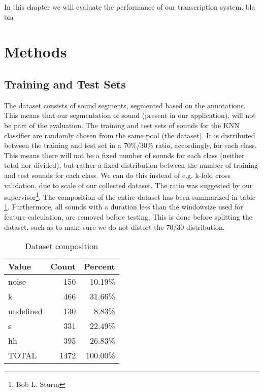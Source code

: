 In this chapter we will evaluate the performance of our transcription system. bla bla

\section{Methods}

	\subsection{Training and Test Sets}
		The dataset consists of sound segments, segmented based on the annotations. This means that our segmentation of sound (present in our application), will not be part of the evaluation.
		The training and test sets of sounds for the KNN classifier are randomly chosen from the same pool (the dataset). It is distributed between the training and test set in a 70\%/30\% ratio, accordingly, for each class. This means there will not be a fixed number of sounds for each class (neither total nor divided), but rather a fixed distribution between the number of training and test sounds for each class. We can do this instead of e.g. k-fold cross validation, due to scale of our collected dataset. The ratio was suggested by our supervisor\footnote{Bob L. Sturm}. The composition of the entire dataset has been summarized in table \ref{table:eval:datasetComposition}. 
		Furthermore, all sounds with a duration less than the windowsize used for feature calculation, are removed before testing. This is done before splitting the dataset, such as to make sure we do not distort the 70/30 distribution.

		\begin{table}
			\centering
			\begin{tabular}{|l|r|r|}
				\hline
				Value  &  Count  & Percent \\ \hline
		      noise    &  150    & 10.19\% \\ \hline
		          k    &  466    & 31.66\% \\ \hline
		  undefined    &  130    &  8.83\% \\ \hline
		          s    &  331    & 22.49\% \\ \hline
		         hh    &  395    & 26.83\% \\ \hline
		      TOTAL    &  1472	 & 100.00\% \\ \hline

			\end{tabular}
			\caption{Dataset composition}
			\label{table:eval:datasetComposition}
		\end{table}


